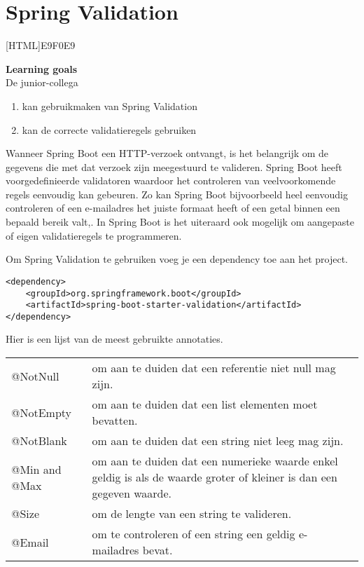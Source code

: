 \chapter{Spring Validation}
    
[HTML]{E9F0E9}{\parbox{\textwidth}{%
\noindent \textbf{Learning goals}\\
De junior-collega
\begin{enumerate}[nolistsep]
\item kan gebruikmaken van Spring Validation
\item kan de correcte validatieregels gebruiken
\end{enumerate}}}

Wanneer Spring Boot een HTTP-verzoek ontvangt, is het belangrijk om de gegevens die met dat verzoek zijn meegestuurd te valideren.  Spring Boot heeft voorgedefinieerde validatoren waardoor het controleren van veelvoorkomende regels eenvoudig kan gebeuren.  Zo kan Spring Boot bijvoorbeeld heel eenvoudig controleren of een e-mailadres het juiste formaat heeft of een getal binnen een bepaald bereik valt,.
In Spring Boot is het uiteraard ook mogelijk om aangepaste of eigen validatieregels te programmeren.

Om Spring Validation te gebruiken voeg je een dependency toe aan het project.

\begin{lstlisting}
<dependency>
	<groupId>org.springframework.boot</groupId>
	<artifactId>spring-boot-starter-validation</artifactId>
</dependency>
\end{lstlisting}

Hier is een lijst van de meest gebruikte annotaties.

\begin{tabularx}{\textwidth}{|l|X|}
\hline
@NotNull & om aan te duiden dat een referentie niet null mag zijn. \\
@NotEmpty & om aan te duiden dat een list elementen moet bevatten. \\
@NotBlank & om aan te duiden dat een string niet leeg mag zijn. \\
@Min and @Max & om aan te duiden dat een numerieke waarde enkel geldig is als de waarde groter of kleiner is dan een gegeven waarde.\\
@Size &  om de lengte van een string te valideren. \\
@Email & om te controleren of een string een geldig e-mailadres bevat.\\
\hline
\end{tabularx}

